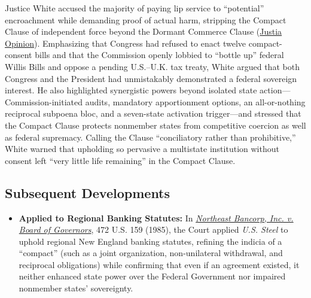 \documentclass[12pt]{article}
\begin{document}
Justice White accused the majority of paying lip service to ``potential'' encroachment while demanding proof of actual harm, stripping the Compact Clause of independent force beyond the Dormant Commerce Clause (\href{https://supreme.justia.com/cases/federal/us/434/452/}{Justia Opinion}). Emphasizing that Congress had refused to enact twelve compact-consent bills and that the Commission openly lobbied to ``bottle up'' federal Willis Bills and oppose a pending U.S.--U.K. tax treaty, White argued that both Congress and the President had unmistakably demonstrated a federal sovereign interest. He also highlighted synergistic powers beyond isolated state action---Commission-initiated audits, mandatory apportionment options, an all-or-nothing reciprocal subpoena bloc, and a seven-state activation trigger---and stressed that the Compact Clause protects nonmember states from competitive coercion as well as federal supremacy. Calling the Clause ``conciliatory rather than prohibitive,'' White warned that upholding so pervasive a multistate institution without consent left ``very little life remaining'' in the Compact Clause.

\subsection{Subsequent Developments}

\begin{itemize}

\item \textbf{Applied to Regional Banking Statutes:} In \href{https://supreme.justia.com/cases/federal/us/472/159/}{\textit{Northeast Bancorp, Inc. v. Board of Governors}}, 472 U.S. 159 (1985), the Court applied \textit{U.S. Steel} to uphold regional New England banking statutes, refining the indicia of a ``compact'' (such as a joint organization, non-unilateral withdrawal, and reciprocal obligations) while confirming that even if an agreement existed, it neither enhanced state power over the Federal Government nor impaired nonmember states' sovereignty.

\end{itemize}
\end{document}
